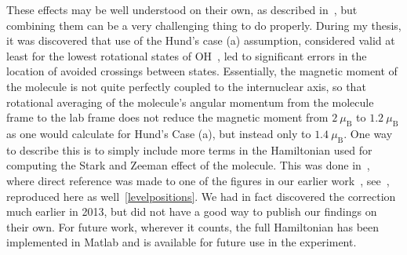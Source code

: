 These effects may be well understood on their own, as described in~\citep[Sec.~2.3.1-2.1]{SawyerThesis2010}, but combining them can be a very challenging thing to do properly.
During my thesis, it was discovered that use of the Hund's case (a) assumption, considered valid at least for the lowest rotational states of OH~\citep[Sec.~2.2]{HudsonThesis2006}, led to significant errors in the location of avoided crossings between states.
Essentially, the magnetic moment of the molecule is not quite perfectly coupled to the internuclear axis, so that rotational averaging of the molecule's angular momentum from the molecule frame to the lab frame does not reduce the magnetic moment from $2~\mu_\text{B}$ to $1.2~\mu_\text{B}$ as one would calculate for Hund's Case (a), but instead only to $1.4~\mu_\text{B}$. 
One way to describe this is to simply include more terms in the Hamiltonian used for computing the Stark and Zeeman effect of the molecule.
This was done in~\cite{Maeda2015}, where direct reference was made to one of the figures in our earlier work~\cite{Stuhl2012evap}, see~\cite[Fig.~12]{Maeda2015}, reproduced here as well~\ref{levelpositions}.
We had in fact discovered the correction much earlier in 2013, but did not have a good way to publish our findings on their own.
For future work, wherever it counts, the full Hamiltonian has been implemented in Matlab and is available for future use in the experiment.


\ifx\justbeingincluded\undefined

\fi